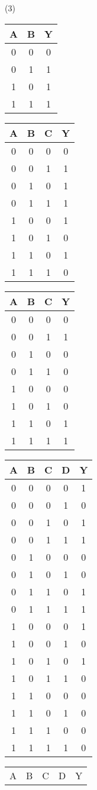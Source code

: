 \begin{tasks}(3)
\task
\begin{tabular}{cc|c}
	A & B & Y\\
	\hline
	0 & 0 & 0\\
	0 & 1 & 1\\
	1 & 0 & 1\\
	1 & 1 & 1
\end{tabular}
\task
\begin{tabular}{ccc|c}
	A & B & C & Y\\
	\hline
	0&0&0&0\\
	0&0&1&1\\
	0&1&0&1\\
	0&1&1&1\\
	1&0&0&1\\
	1&0&1&0\\
	1&1&0&1\\
	1&1&1&0
\end{tabular}
\task
\begin{tabular}{ccc|c}
	A & B & C & Y\\
	\hline
	0&0&0&0\\
	0&0&1&1\\
	0&1&0&0\\
	0&1&1&0\\
	1&0&0&0\\
	1&0&1&0\\
	1&1&0&1\\
	1&1&1&1
\end{tabular}
\task
\begin{tabular}{cccc|c}
	A & B & C & D & Y\\
	\hline
	0&0&0&0&1\\
	0&0&0&1&0\\
	0&0&1&0&1\\
	0&0&1&1&1\\
	0&1&0&0&0\\
	0&1&0&1&0\\
	0&1&1&0&1\\
	0&1&1&1&1\\
	1&0&0&0&1\\
	1&0&0&1&0\\
	1&0&1&0&1\\
	1&0&1&1&0\\
	1&1&0&0&0\\
	1&1&0&1&0\\
	1&1&1&0&0\\
	1&1&1&1&0
\end{tabular}
\task
\begin{tabular}{cccc|c}
	A & B & C & D & Y\\

\end{tabular}
\end{tasks}
